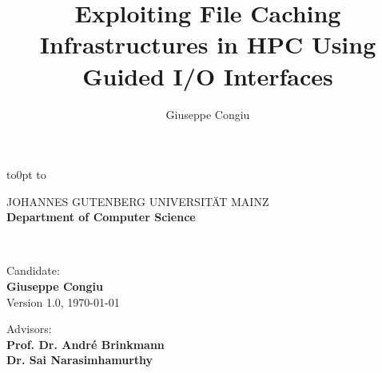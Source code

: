 \documentclass[a4paper,titlepage,oneside,10pt]{book}
\title{Exploiting File Caching Infrastructures in HPC Using Guided I/O Interfaces}
\author{Giuseppe Congiu}
\begin{document}
\hypersetup{citecolor=black,filecolor=black,linkcolor=black,urlcolor=blue} %

\begin{titlepage}
\thispagestyle{empty}

\begin{flushleft}
\vbox to0pt{
\vbox to\vss}
\end{flushleft}

\begin{center}
        \large JOHANNES GUTENBERG UNIVERSIT{\"A}T MAINZ \\
        \large \textbf{Department of Computer Science}
\end{center}

\begin{center}
	 \\
	\vspace{0.2cm}
\end{center}
\vspace{3cm}

\begin{flushright}
	Candidate:\\
	\textbf{Giuseppe Congiu}\\
	Version 1.0, \today
\end{flushright}

\begin{flushright}
	Advisors:\\
	\textbf{Prof. Dr. Andr\'e Brinkmann}\\
        \textbf{Dr. Sai Narasimhamurthy}
\end{flushright}

\end{titlepage}
\end{document}
